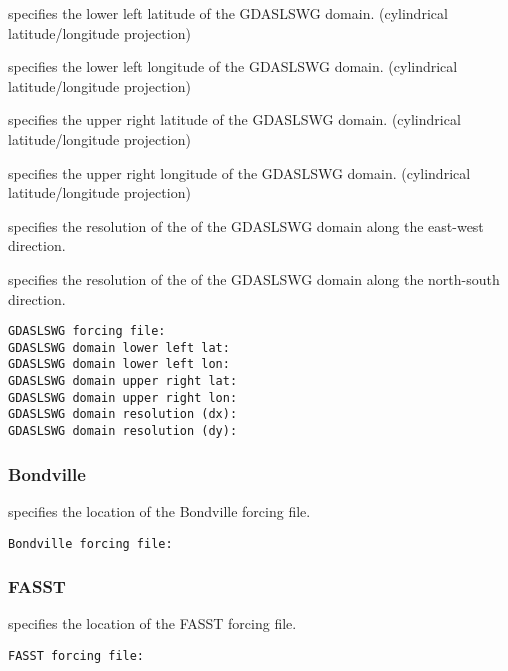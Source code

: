   specifies the lower left
 latitude of the GDASLSWG domain.
 (cylindrical latitude/longitude projection)

  specifies the lower left
 longitude of the GDASLSWG domain.
 (cylindrical latitude/longitude projection)

  specifies the upper right
 latitude of the GDASLSWG domain.
 (cylindrical latitude/longitude projection)

  specifies the upper right
 longitude of the GDASLSWG domain.
 (cylindrical latitude/longitude projection)

  specifies the resolution of the 
 of the GDASLSWG domain along the east-west direction.

  specifies the resolution of the 
 of the GDASLSWG domain along the north-south direction.
 

 \begin{Verbatim}[frame=single]
GDASLSWG forcing file:
GDASLSWG domain lower left lat:
GDASLSWG domain lower left lon:
GDASLSWG domain upper right lat:
GDASLSWG domain upper right lon:
GDASLSWG domain resolution (dx):
GDASLSWG domain resolution (dy):
 \end{Verbatim}

 
 \subsubsection{Bondville} \label{sssec:bondville}
 

 
  specifies the location of the
 Bondville forcing file.
 

 \begin{Verbatim}[frame=single]
Bondville forcing file:
 \end{Verbatim}


 
 
 \subsubsection{FASST} \label{sssec:fasstforc}
 

 
  specifies the location of the
 FASST forcing file.
 

 \begin{Verbatim}[frame=single]
FASST forcing file:
 \end{Verbatim}
 

